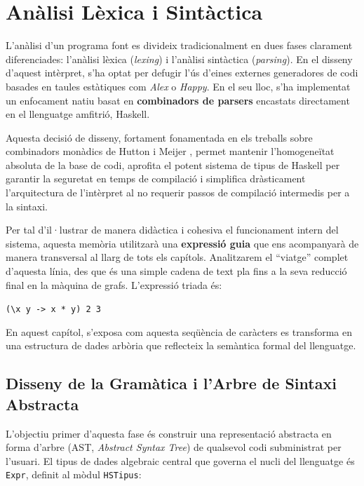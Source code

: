 \chapter{Anàlisi Lèxica i Sintàctica}
L'anàlisi d'un programa font es divideix tradicionalment en dues fases clarament diferenciades: l'anàlisi lèxica (\textit{lexing}) i l'anàlisi sintàctica (\textit{parsing}). En el disseny d'aquest intèrpret, s'ha optat per defugir l'ús d'eines externes generadores de codi basades en taules estàtiques com \textit{Alex} o \textit{Happy}. En el seu lloc, s'ha implementat un enfocament natiu basat en \textbf{combinadors de parsers} encastats directament en el llenguatge amfitrió, Haskell. 

Aquesta decisió de disseny, fortament fonamentada en els treballs sobre combinadors monàdics de Hutton i Meijer \cite{hutton1998monadic}, permet mantenir l'homogeneïtat absoluta de la base de codi, aprofita el potent sistema de tipus de Haskell per garantir la seguretat en temps de compilació i simplifica dràsticament l'arquitectura de l'intèrpret al no requerir passos de compilació intermedis per a la sintaxi.

Per tal d'il·lustrar de manera didàctica i cohesiva el funcionament intern del sistema, aquesta memòria utilitzarà una \textbf{expressió guia} que ens acompanyarà de manera transversal al llarg de tots els capítols. Analitzarem el ``viatge'' complet d'aquesta línia, des que és una simple cadena de text pla fins a la seva reducció final en la màquina de grafs. L'expressió triada és:

\begin{center}
    \texttt{(\textbackslash x y -> x * y) 2 3}
\end{center}

En aquest capítol, s'exposa com aquesta seqüència de caràcters es transforma en una estructura de dades arbòria que reflecteix la semàntica formal del llenguatge.

\section{Disseny de la Gramàtica i l'Arbre de Sintaxi Abstracta}

L'objectiu primer d'aquesta fase és construir una representació abstracta en forma d'arbre (AST, \textit{Abstract Syntax Tree}) de qualsevol codi subministrat per l'usuari. El tipus de dades algebraic central que governa el nucli del llenguatge és \texttt{Expr}, definit al mòdul \texttt{HSTipus}:

